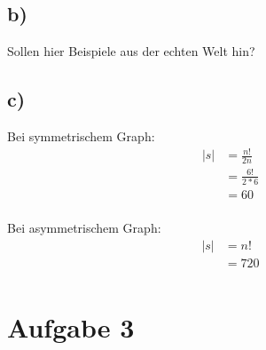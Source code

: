 \documentclass[a4paper,11pt]{article}
\begin{document}
\subsection*{b)}

Sollen hier Beispiele aus der echten Welt hin?

\subsection*{c)}

Bei symmetrischem Graph: \\
\begin{align*}
    |s| &= \frac{n!}{2n} \\
        &= \frac{6!}{2*6} \\
        &= 60 \\
\end{align*}

Bei asymmetrischem Graph: \\
\begin{align*}
    |s| &= n! \\
        &= 720 \\
\end{align*}

\section*{Aufgabe 3}
\end{document}

